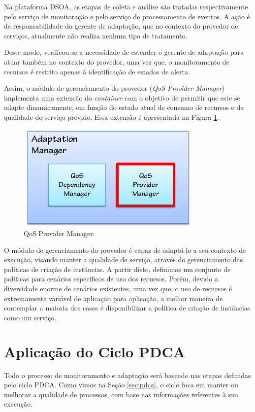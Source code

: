 Na plataforma DSOA, as etapas de coleta e análise são tratadas respectivamente pelo serviço de monitoração e pelo serviço de processamento de eventos. A ação é de responsabilidade do gerente de adaptação, que no contexto do provedor de serviços, atualmente não realiza nenhum tipo de tratamento.

Deste modo, verificou-se a necessidade de estender o gerente de adaptação para atuar também no contexto do provedor, uma vez que, o monitoramento de recursos é restrito apenas à identificação de estados de alerta.

Assim, o módulo de gerenciamento do provedor (\textit{QoS Provider Manager}) implementa uma extensão do \textit{container} com o  objetivo de permitir que este se adapte dinamicamente, em função do estado atual de consumo de recursos e da qualidade do serviço provido. Essa extensão é apresentada na Figura \ref{fig:adapt_module}.


\begin{figure}[htp]
\centering
\includegraphics[width=9cm]{chapters/chapter4/adaptation-manager.png}
\caption[QoS Provider Manager]{QoS Provider Manager.}
\label{fig:adapt_module}
\end{figure}

O módulo de gerenciamento do provedor é capaz de adaptá-lo a seu contexto de execução, visando manter a qualidade de serviço, através do gerenciamento das políticas de criação de instâncias. A partir disto, definimos um conjunto de políticas para cenários específicos de uso dos recursos. Porém, devido a diversidade enorme de cenários existentes, uma vez que, o uso de recursos é extremamente variável de aplicação para aplicação, a melhor maneira de contemplar a maioria dos casos é disponibilizar a política de criação de instâncias como um serviço.  

\section{Aplicação do Ciclo PDCA}
Todo o processo de monitoramento e adaptação será baseado nas etapas definidas pelo ciclo PDCA. Como vimos na Seção \ref{sec:pdca}, o ciclo foca em manter ou melhorar a qualidade de processos, com base nas informações referentes à sua execução.

